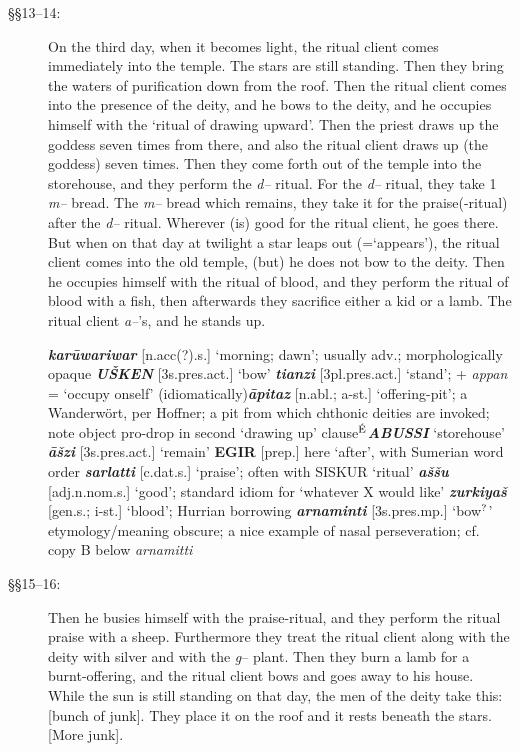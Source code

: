 \documentclass[10pt]{article}
\newcommand{\supersc}[1]{$^{\textrm{\scriptsize{#1}}}$}  	%
\newcommand{\bit}[1]{\textbf{\textit{#1}}}				%
\newcommand{\p}[1]{{\tiny[{#1}]}}					%
\renewcommand{\.}[1]{\textsubdot{#1}}
\begin{document}
\begin{description}
\item[\S\S13--14:] On the third day, when it becomes light, the ritual client comes immediately into the temple. The stars are still standing. Then they bring the waters of purification down from the roof. Then the ritual client comes into the presence of the deity, and he bows to the deity, and he occupies himself with the `ritual of drawing upward'. Then the priest draws up the goddess seven times from there, and also the ritual client draws up (the goddess) seven times. Then they come forth out of the temple into the storehouse, and they perform the \textit{d--} ritual. For the \textit{d--} ritual, they take 1 \textit{m--} bread. The \textit{m--} bread which remains, they take it for the praise(-ritual)  after the \textit{d--} ritual. Wherever (is) good for the ritual client, he goes there. But when on that day at twilight a star leaps out (=`appears'), the ritual client comes into the old temple, (but) he does not bow to the deity. Then he occupies himself with the ritual of blood, and they perform the ritual of blood with a fish, then afterwards they sacrifice either a kid or a lamb. The ritual client \textit{a--}'s, and he stands up.


\begin{notes}

\bit{kar\=uwariwar} \p{n.acc(?).s.} `morning; dawn'; usually adv.; morphologically opaque \bit{U\v{S}KEN} \p{3s.pres.act.} `bow' \bit{tianzi} \p{3pl.pres.act.} `stand'; + \textit{appan} = `occupy onself' (idiomatically)\bit{\=apitaz} \p{n.abl.; a-st.} `offering-pit'; a Wanderw\"ort, per Hoffner; a pit from which chthonic deities are invoked; note object pro-drop in second `drawing up' clause\textbf{\supersc{\'E}}\bit{ABUSSI} `storehouse'  \bit{\=a\v{s}zi} \p{3s.pres.act.} `remain' \textbf{EGIR} \p{prep.} here `after', with Sumerian word order \bit{sarlatti} \p{c.dat.s.} `praise'; often with SISKUR `ritual' \bit{a\v{s}\v{s}u} \p{adj.n.nom.s.} `good'; standard idiom for `whatever X would like' \bit{zurkiya\v{s}} \p{gen.s.; i-st.} `blood'; Hurrian borrowing \bit{arnaminti} \p{3s.pres.mp.} `bow\supersc{?}' etymology/meaning obscure; a nice example of nasal perseveration; cf. copy B below \textit{arnamitti} 

\end{notes}


\item[\S\S15--16:] Then he busies himself with the praise-ritual, and they perform the ritual praise with a sheep. Furthermore they treat the ritual client along with the deity with silver and with the \textit{g}-- plant. Then they burn a lamb for a burnt-offering, and the ritual client bows and goes away to his house. While the sun is still standing on that day, the men of the deity take this: [bunch of junk]. They place it on the roof and it rests beneath the stars. [More junk].


\end{description}
\end{document}
